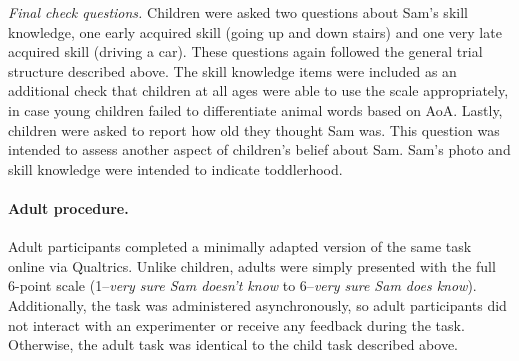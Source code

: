 \documentclass[10pt, letterpaper]{article}
\begin{document}
\emph{Final check questions.} Children were asked two questions about
Sam's skill knowledge, one early acquired skill (going up and down
stairs) and one very late acquired skill (driving a car). These
questions again followed the general trial structure described above.
The skill knowledge items were included as an additional check that
children at all ages were able to use the scale appropriately, in case
young children failed to differentiate animal words based on AoA.
Lastly, children were asked to report how old they thought Sam was. This
question was intended to assess another aspect of children's belief
about Sam. Sam's photo and skill knowledge were intended to indicate
toddlerhood.

\hypertarget{adult-procedure.}{%
\paragraph{Adult procedure.}\label{adult-procedure.}}

Adult participants completed a minimally adapted version of the same
task online via Qualtrics. Unlike children, adults were simply presented
with the full 6-point scale (1--\emph{very sure Sam doesn't know} to
6--\emph{very sure Sam does know}). Additionally, the task was
administered asynchronously, so adult participants did not interact with
an experimenter or receive any feedback during the task. Otherwise, the
adult task was identical to the child task described above.
\end{document}
